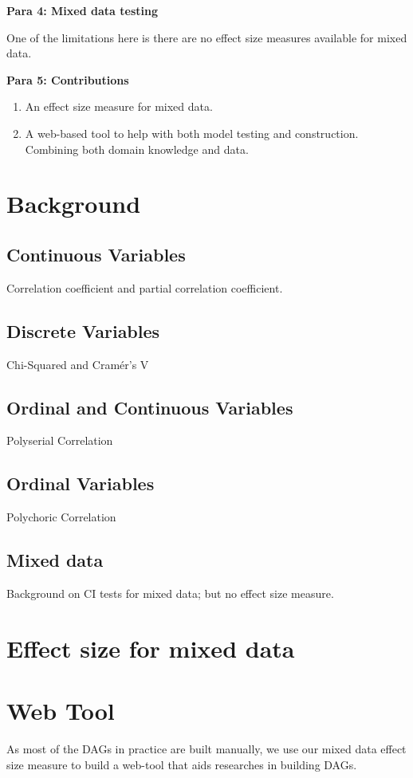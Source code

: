 \documentclass{article}
\begin{document}
\textbf{Para 4: Mixed data testing}

One of the limitations here is there are no effect size measures available for mixed data.

\textbf{Para 5: Contributions}
\begin{enumerate}
	\item An effect size measure for mixed data. 
	\item A web-based tool to help with both model testing and construction. Combining both domain knowledge and data.
\end{enumerate}

\section{Background}

\subsection{Continuous Variables}
Correlation coefficient and partial correlation coefficient.

\subsection{Discrete Variables}
Chi-Squared and Cram\'er's V

\subsection{Ordinal and Continuous Variables}
Polyserial Correlation

\subsection{Ordinal Variables}
Polychoric Correlation

\subsection{Mixed data}
Background on CI tests for mixed data; but no effect size measure.

\section{Effect size for mixed data}

\section{Web Tool}
As most of the DAGs in practice are built manually, we use our mixed data effect size measure to build a web-tool that aids researches in building DAGs.
\end{document}
